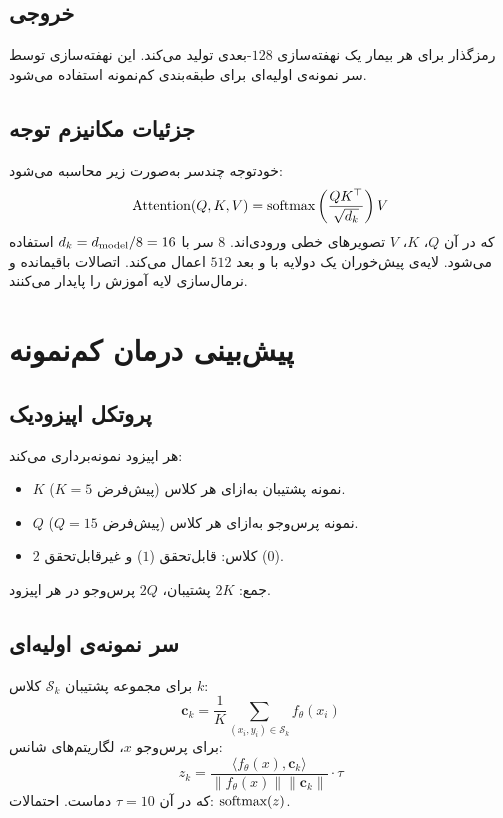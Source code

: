 \subsection{خروجی}

رمزگذار برای هر بیمار یک نهفته‌سازی $128$-بعدی تولید می‌کند. این نهفته‌سازی توسط سر نمونه‌ی اولیه‌ای برای طبقه‌بندی کم‌نمونه استفاده می‌شود.

\subsection{جزئیات مکانیزم توجه}

خودتوجه چندسر به‌صورت زیر محاسبه می‌شود:
\begin{equation}
\text{Attention}(Q, K, V) = \text{softmax}\left(\frac{QK^\top}{\sqrt{d_k}}\right) V
\end{equation}
که در آن $Q$، $K$، $V$ تصویرهای خطی ورودی‌اند. $8$ سر با $d_k = d_{\text{model}}/8 = 16$ استفاده می‌شود. لایه‌ی پیش‌خوران یک  دولایه با  و بعد $512$ اعمال می‌کند. اتصالات باقیمانده و نرمال‌سازی لایه آموزش را پایدار می‌کنند.

\section{پیش‌بینی درمان کم‌نمونه}

\subsection{پروتکل اپیزودیک}

هر اپیزود نمونه‌برداری می‌کند:
\begin{itemize}
\item $K$ نمونه پشتیبان به‌ازای هر کلاس (پیش‌فرض $K=5$).
\item $Q$ نمونه پرس‌وجو به‌ازای هر کلاس (پیش‌فرض $Q=15$).
\item $2$ کلاس: قابل‌تحقق ($1$) و غیرقابل‌تحقق ($0$).
\end{itemize}
جمع: $2K$ پشتیبان، $2Q$ پرس‌وجو در هر اپیزود.

\subsection{سر نمونه‌ی اولیه‌ای}

برای مجموعه پشتیبان $\mathcal{S}_k$ کلاس $k$:
\begin{equation}
\mathbf{c}_k = \frac{1}{K} \sum_{(x_i, y_i) \in \mathcal{S}_k} f_\theta(x_i)
\end{equation}
برای پرس‌وجو $x$، لگاریتم‌های شانس:
\begin{equation}
z_k = \frac{\langle f_\theta(x), \mathbf{c}_k \rangle}{\|f_\theta(x)\| \|\mathbf{c}_k\|} \cdot \tau
\end{equation}
که در آن $\tau = 10$ دماست. احتمالات: $\text{softmax}(z)$.

